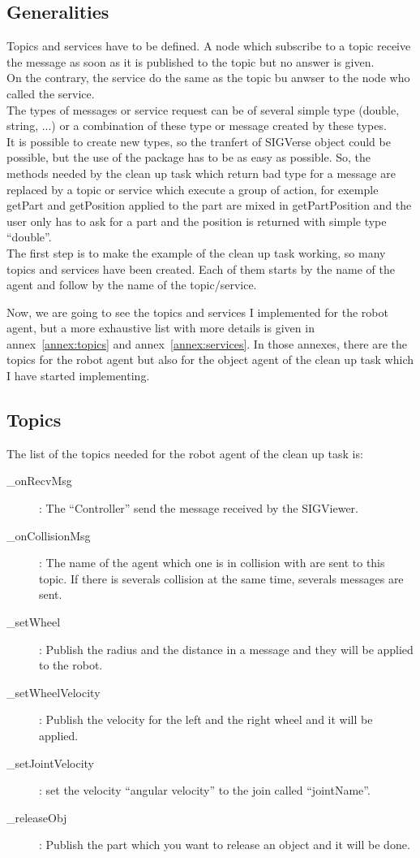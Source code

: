 \subsection{Generalities}
Topics and services have to be defined. A node which subscribe to a topic receive the message as soon as it is published to the topic but no answer is given.\\
On the contrary, the service do the same as the topic bu anwser to the node who called the service.\\
The types of messages or service request can be of several simple type (double, string, ...) or a combination of these type or message created by these types.\\
It is possible to create new types, so the tranfert of SIGVerse object could be possible, but the use of the package has to be as easy as possible. So, the methods needed by the clean up task which return bad type for a message are replaced by a topic or service which execute a group of action, for exemple getPart and getPosition applied to the part are mixed in getPartPosition and the user only has to ask for a part and the position is returned with simple type ``double''.\\

The first step is to make the example of the clean up task working, so many topics and services have been created. Each of them starts by the name of the agent and follow by the name of the topic/service.

Now, we are going to see the topics and services I implemented for the robot agent, but a more exhaustive list with more details is given in annex~\ref{annex:topics} and annex~\ref{annex:services}. In those annexes, there are the topics for the robot agent but also for the object agent of the clean up task which I have started implementing.

\subsection{Topics}
The list of the topics needed for the robot agent of the clean up task is:
\begin{description}
	\item[\_onRecvMsg] : The ``Controller'' send the message received by the SIGViewer.
	\item[\_onCollisionMsg] : The name of the agent which one is in collision with are sent to this topic. If there is severals collision at the same time, severals messages are sent.
	\item[\_setWheel] : Publish the radius and the distance in a message and they will be applied to the robot.
	\item[\_setWheelVelocity] : Publish the velocity for the left and the right wheel and it will be applied.
	\item[\_setJointVelocity] : set the velocity ``angular velocity'' to the join called ``jointName''.
	\item[\_releaseObj]: Publish the part which you want to release an object and it will be done.
\end{description}

